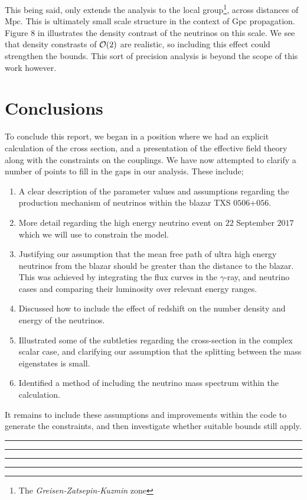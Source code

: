 \documentclass[10pt]{article}
\begin{document}
This being said, \cite{Ringwald2004} only extends the analysis to the local group\footnote{The \textit{Greisen-Zatsepin-Kuzmin} zone}, across distances of $\textrm{Mpc}$. This is ultimately small scale structure in the context of $\textrm{Gpc}$ propagation. Figure 8 in \cite{Ringwald2004} illustrates the density contrast of the neutrinos on this scale. We see that density constrasts of $\mathcal{O}(2)$ are realistic, so including this effect could strengthen the bounds. This sort of precision analysis is beyond the scope of this work however.
\section{Conclusions}
To conclude this report, we began in a position where we had an explicit calculation of the cross section, and a presentation of the effective field theory along with the constraints on the couplings. We have now attempted to clarify a number of points to fill in the gaps in our analysis. These include;
\begin{enumerate}
  \item A clear description of the parameter values and assumptions regarding the production mechanism of neutrinos within the blazar TXS $0506$+$056$.
  \item More detail regarding the high energy neutrino event on $22$ September $2017$ which we will use to constrain the model.
  \item Justifying our assumption that the mean free path of ultra high energy neutrinos from the blazar should be greater than the distance to the blazar. This was achieved by integrating the flux curves in the $\gamma$-ray, and neutrino cases and comparing their luminosity over relevant energy ranges.
  \item Discussed how to include the effect of redshift on the number density and energy of the neutrinos.
  \item Illustrated some of the subtleties regarding the cross-section in the complex scalar case, and clarifying our assumption that the splitting between the mass eigenstates is small.
  \item Identified a method of including the neutrino mass spectrum within the calculation.
\end{enumerate}
It remains to include these assumptions and improvements within the code to generate the constraints, and then investigate whether suitable bounds still apply.
\vspace{20pt}
\hrule
\vspace{1pt}
\hrule
\vspace{3pt}

\vspace{15pt}
\hrule
\vspace{1pt}
\hrule
\end{document}
